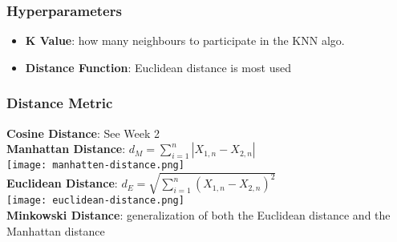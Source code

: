 \subsubsection{Hyperparameters}
\begin{itemize}
    \item \textbf{K Value}: how many neighbours to participate in the KNN algo.
    \item \textbf{Distance Function}: Euclidean distance is most used
\end{itemize}

\subsubsection{Distance Metric}
\textbf{Cosine Distance}: See Week 2\\
\textbf{Manhattan Distance}: $d_M = \displaystyle\sum_{i = 1}^{n}|X_{1,n} - X_{2,n}|$\\
\texttt{[image: manhatten-distance.png]}\\
\textbf{Euclidean Distance}: $d_E = \sqrt{\displaystyle\sum_{i = 1}^{n}(X_{1,n} - X_{2,n})^2}$\\
\texttt{[image: euclidean-distance.png]}\\
\textbf{Minkowski Distance}:  generalization of both the Euclidean distance and the Manhattan distance
